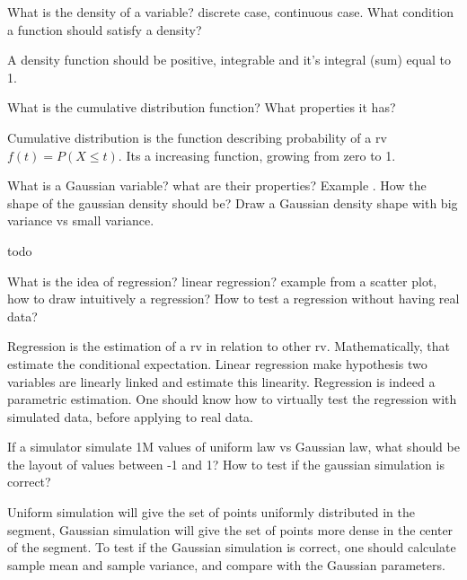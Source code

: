 \documentclass[answers]{exam}
\newcommand*{\ANCOAFINANCE}{}%
\begin{document}
\begin{questions}
\question What is the density of a variable? discrete case, continuous case. What condition a function should satisfy a density?
\begin{solution}[.2in]
A density function should be positive, integrable and it's integral (sum) equal to 1.
\end{solution}

\question What is the cumulative distribution function? What properties it has?
\begin{solution}[.2in]
Cumulative distribution is the function describing probability of a rv $f(t) = P(X\leq t)$. Its a increasing function, growing from zero to 1.
\end{solution}

\question What is a Gaussian variable? what are their properties? Example . How the shape of the gaussian density should be?  Draw a Gaussian density shape with big variance vs small variance.
\begin{solution}[.2in]
	todo
\end{solution}

\question What is the idea of regression? linear regression? example from a scatter plot, how to draw intuitively a regression? How to test a regression without having real data?
\begin{solution}[.2in]
Regression is the estimation of a rv in relation to other rv. Mathematically, that estimate the conditional expectation. Linear regression make hypothesis two variables are linearly linked and estimate this linearity. Regression is indeed a parametric estimation. One should know how to virtually test the regression with simulated data, before applying to real data.
\end{solution}

\question If a simulator simulate 1M values of uniform law vs Gaussian law, what should be the layout of values between -1 and 1? How to test if the gaussian simulation is correct?
\begin{solution}[.2in]
Uniform simulation will give the set of points uniformly distributed in the segment, Gaussian simulation will give the set of points more dense in the center of the segment. To test if the Gaussian simulation is correct, one should calculate sample mean and sample variance, and compare with the Gaussian parameters.
\end{solution}
\end{questions}
\fi
\ifdefined\ANCOAFINANCE
\newpage
\end{document}
